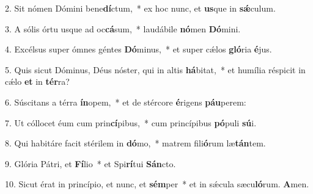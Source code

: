 \item 2. Sit nómen Dómini bene\textbf{dí}ctum,~* ex hoc nunc, et \textbf{us}que in \textbf{sǽ}culum.

\item 3. A sólis órtu usque ad oc\textbf{cá}sum,~* laudábile \textbf{nó}men \textbf{Dó}mini.

\item 4. Excélsus super ómnes géntes \textbf{Dó}minus,~* et super cǽlos \textbf{gló}ria \textbf{é}jus.

\item 5. Quis sicut Dóminus, Déus nóster, qui in altis \textbf{há}bitat,~* et humília réspicit in cǽlo \textbf{et} in \textbf{tér}ra?

\item 6. Súscitans a térra \textbf{ín}opem,~* et de stércore \textbf{é}rigens \textbf{páu}perem:

\item 7. Ut cóllocet éum cum prin\textbf{cí}pibus,~* cum princípibus \textbf{pó}puli \textbf{sú}i.

\item 8. Qui habitáre facit stérilem in \textbf{dó}mo,~* matrem fili\textbf{ó}rum læ\textbf{tán}tem.

\item 9. Glória Pátri, et \textbf{Fí}lio~* et Spi\textbf{rí}tui \textbf{Sán}cto.

\item 10. Sicut érat in princípio, et nunc, et \textbf{sém}per~* et in sǽcula sæcu\textbf{ló}rum. \textbf{A}men.
